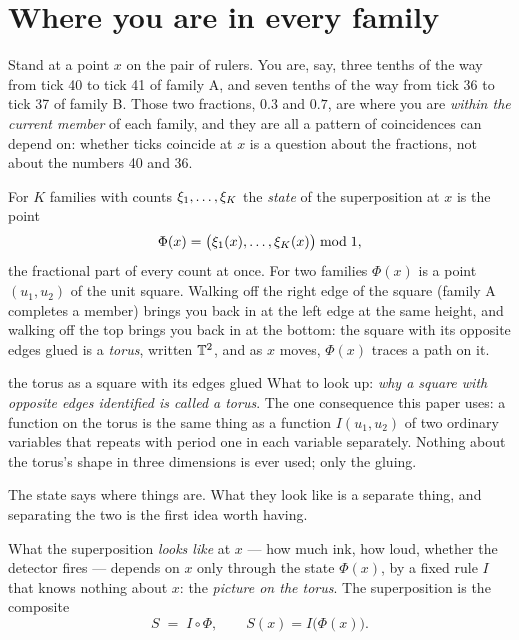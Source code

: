 \section{Where you are in every family}
\label{sec:torus}

Stand at a point $x$ on the pair of rulers. You are, say, three tenths of the
way from tick 40 to tick 41 of family A, and seven tenths of the way from
tick 36 to tick 37 of family B. Those two fractions, $0.3$ and $0.7$, are
where you are \emph{within the current member} of each family, and they are
all a pattern of coincidences can depend on: whether ticks coincide at $x$ is
a question about the fractions, not about the numbers 40 and 36.

\begin{definition}
\label{def:torus}
For $K$ families with counts $\xi_1,\dots,\xi_K$ the \emph{state} of the
superposition at $x$ is the point
\[
  \Phi(x)=\big(\xi_1(x),\dots,\xi_K(x)\big)\bmod 1,
\]
the fractional part of every count at once. For two families $\Phi(x)$ is a
point $(u_1,u_2)$ of the unit square. Walking off the right edge of the
square (family A completes a member) brings you back in at the left edge at
the same height, and walking off the top brings you back in at the bottom:
the square with its opposite edges glued is a \emph{torus}, written
$\mathbb{T}^2$, and as $x$ moves, $\Phi(x)$ traces a path on it.
\end{definition}

\begin{lookup}{the torus as a square with its edges glued}
What to look up: \emph{why a square with opposite edges identified is called
a torus}. The one consequence this paper uses: a function on the torus is
the same thing as a function $I(u_1,u_2)$ of two ordinary variables that
repeats with period one in each variable separately. Nothing about the
torus's shape in three dimensions is ever used; only the gluing.
\end{lookup}

The state says where things are. What they look like is a separate thing,
and separating the two is the first idea worth having.

\begin{definition}
\label{def:picture}
What the superposition \emph{looks like} at $x$ --- how much ink, how loud,
whether the detector fires --- depends on $x$ only through the state
$\Phi(x)$, by a fixed rule $I$ that knows nothing about $x$: the
\emph{picture on the torus}. The superposition is the composite
\[
  S \;=\; I\circ\Phi,\qquad S(x)=I\big(\Phi(x)\big).
\]
\end{definition}

